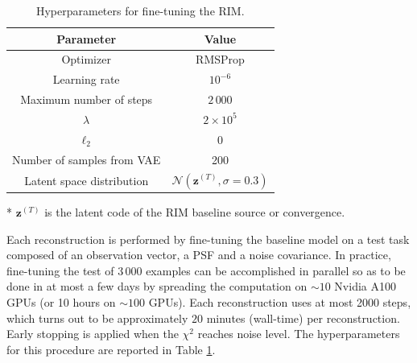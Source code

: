 \begin{table}[ht!]
\centering
\begin{threeparttable}
        \caption{Hyperparameters for fine-tuning the RIM.}
        \label{tab:fine-tuning hparams}
        \begin{tabular}{cc}
                Parameter & Value \\\hline\hline
                Optimizer & RMSProp \\
                Learning rate & $10^{-6}$\\
                Maximum number of steps & $2\,000$\\
                $\lambda$ & $2\times 10^{5}$\\
                $\ell_2$ & 0 \\
                Number of samples from VAE & 200 \\
                Latent space distribution & $\mathcal{N}(\mathbf{z}^{(T)}, \sigma=0.3)$\tnote{*}\\
                \hline
        \end{tabular}
\begin{tablenotes}\footnotesize
\item[*]$\mathbf{z}^{(T)}$ is the latent code of the RIM baseline source or convergence.
\end{tablenotes}
\end{threeparttable}
\end{table}

Each reconstruction is performed by fine-tuning the baseline model 
on a test task composed of an observation vector, a PSF and a noise covariance.
In practice, fine-tuning the test of $3\,000$ examples can be accomplished in parallel so as to be done in at most a few days by spreading the computation on $\sim 10$ Nvidia A100 GPUs (or 10 hours on $\sim 100$ GPUs). Each reconstruction uses at most 2000 steps, which turns out to be approximately $20$ minutes (wall-time) per reconstruction. Early stopping is applied when the $\chi^2$ reaches noise level. The hyperparameters for this procedure are reported in Table \ref{tab:fine-tuning hparams}.



